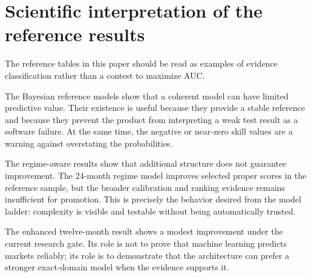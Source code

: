\documentclass[11pt]{article}
\begin{document}
\section{Scientific interpretation of the reference results}
The reference tables in this paper should be read as examples of evidence classification rather than a contest to maximize AUC.

The Bayesian reference models show that a coherent model can have limited predictive value. Their existence is useful because they provide a stable reference and because they prevent the product from interpreting a weak test result as a software failure. At the same time, the negative or near-zero skill values are a warning against overstating the probabilities.

The regime-aware results show that additional structure does not guarantee improvement. The 24-month regime model improves selected proper scores in the reference sample, but the broader calibration and ranking evidence remains insufficient for promotion. This is precisely the behavior desired from the model ladder: complexity is visible and testable without being automatically trusted.

The enhanced twelve-month result shows a modest improvement under the current research gate. Its role is not to prove that machine learning predicts markets reliably; its role is to demonstrate that the architecture can prefer a stronger exact-domain model when the evidence supports it.
\end{document}
